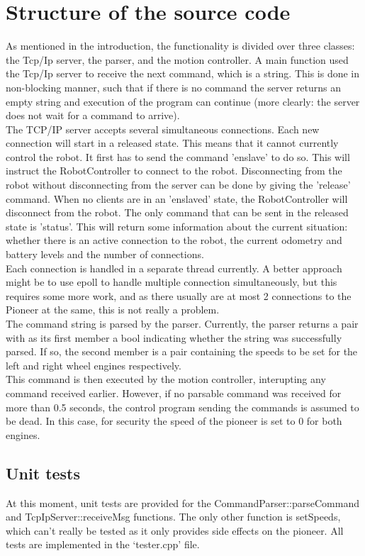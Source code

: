 \documentclass[a4paper, 12pt, oneside]{report}
\begin{document}
\section{Structure of the source code}
As mentioned in the introduction, the functionality is divided over three
classes: the Tcp/Ip server, the parser, and the motion controller. A main
function used the Tcp/Ip server to receive the next command, which is a string.
This is done in non-blocking manner, such that if there is no command the server
returns an empty string and execution of the program can continue (more clearly:
the server does not wait for a command to arrive).\\

The TCP/IP server accepts several simultaneous connections. Each new connection
will start in a released state. This means that it cannot currently control the
robot. It first has to send the command 'enslave' to do so. This will instruct
the RobotController to connect to the robot. Disconnecting from the robot
without disconnecting from the server can be done by giving the 'release'
command. When no clients are in an 'enslaved' state, the RobotController will
disconnect from the robot. The only command that can be sent in the released
state is 'status'. This will return some information about the current
situation: whether there is an active connection to the robot, the current
odometry and battery levels and the number of connections. \\

Each connection is handled in a separate thread currently. A better approach
might be to use epoll to handle multiple connection simultaneously, but this
requires some more work, and as there usually are at most 2 connections to the
Pioneer at the same, this is not really a problem. \\

The command string is parsed by the parser. Currently, the parser returns a pair
with as its first member a bool indicating whether the string was successfully
parsed. If so, the second member is a pair containing the speeds to be set for
the left and right wheel engines respectively. \\

This command is then executed by the motion controller, interupting any command
received earlier. However, if no parsable command was received for more than 0.5
seconds, the control program sending the commands is assumed to be dead. In this
case, for security the speed of the pioneer is set to 0 for both engines. \\

\subsection{Unit tests}
At this moment, unit tests are provided for the CommandParser::parseCommand and
TcpIpServer::receiveMsg functions. The only other function is setSpeeds, which
can't really be tested as it only provides side effects on the pioneer. All
tests are implemented in the `tester.cpp' file.
\end{document}
